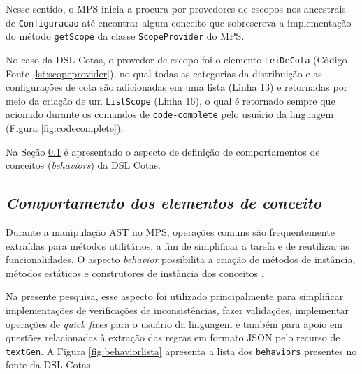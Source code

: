 

\newpage

Nesse sentido, o \gls{MPS} inicia a procura por provedores de escopos nos ancestrais de \texttt{Configuracao} até encontrar algum conceito que sobrescreva a implementação do método \texttt{getScope} da classe \texttt{ScopeProvider} do \gls{MPS}. 

No caso da DSL Cotas, o provedor de escopo foi o elemento \texttt{LeiDeCota} (Código Fonte \ref{lst:scopeprovider}), no qual todas as categorias da distribuição e as configurações de cota são adicionadas em uma lista (Linha 13) e retornadas por meio da criação de um \texttt{ListScope} (Linha 16), o qual é retornado sempre que acionado durante os comandos de \texttt{code-complete} pelo usuário da linguagem (Figura \ref{fig:codecomplete}).





Na Seção \ref{sub:sec:comportamentos} é apresentado o aspecto de definição de comportamentos de conceitos (\textit{behaviors}) da DSL Cotas.


\subsection{\textit{Comportamento dos elementos de conceito}}
\label{sub:sec:comportamentos}

Durante a manipulação \gls{AST} no \gls{MPS}, operações comuns são frequentemente extraídas para métodos utilitários, a fim de simplificar a tarefa e de reutilizar as funcionalidades. O aspecto \textit{behavior} possibilita a criação de métodos de instância, métodos estáticos e construtores de instância dos conceitos \cite{jetbrains}.

Na presente pesquisa, esse aspecto foi utilizado principalmente para simplificar implementações de verificações de inconsistências, fazer validações, implementar operações de \textit{quick fixes} para o usuário da linguagem e também para apoio em questões relacionadas à extração das regras em formato JSON pelo recurso de \texttt{textGen}. A Figura \ref{fig:behaviorlista} apresenta a lista dos \texttt{behaviors} presentes no fonte da DSL Cotas.



